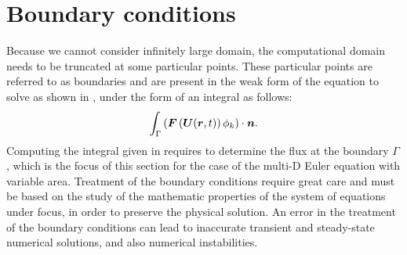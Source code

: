 \section{Boundary conditions} \label{sec:bc}
Because we cannot consider infinitely large domain, the computational domain needs to be truncated at some particular points. These particular points are referred to as boundaries and are present in the weak form of the equation to solve as shown in , under the form of an integral as follows:
%
\begin{equation}\label{eq:hyp_weak_bc_sct3}
\int_\Gamma \left( \boldsymbol F \left( \boldsymbol U(\boldsymbol r, t) \right) \phi_k \right) \cdot \boldsymbol n.
\end{equation}
%
Computing the integral given in  requires to determine the flux at the boundary $\Gamma$, which is the focus of this section for the case of the multi-D Euler equation with variable area. Treatment of the boundary conditions require great care and must be based on the study of the mathematic properties of the system of equations under focus, in order to preserve the physical solution. An error in the treatment of the boundary conditions can lead to inaccurate transient and steady-state numerical solutions, and also numerical instabilities.


